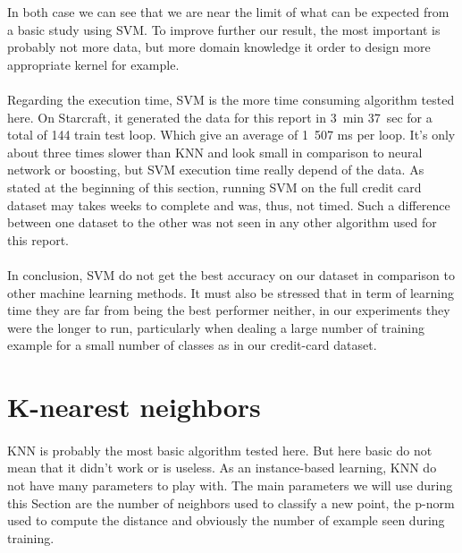\documentclass[twocolumn,a4paper,10pt]{article}
\begin{document}
In both case we can see that we are near the limit of what can be expected from a basic study using SVM. To improve further our result, the most important is probably not more data, but more domain knowledge it order to design more appropriate kernel for example.

\paragraph{}
Regarding the execution time, SVM is the more time consuming algorithm tested here. On Starcraft, it generated the data for this report in 3~min 37~sec for a total of 144 train test loop. Which give an average of 1~507 ms per loop. It's only about three times slower than KNN and look small in comparison to neural network or boosting, but SVM execution time really depend of the data. As stated at the beginning of this section, running SVM on the full credit card dataset may takes weeks to complete and was, thus, not timed. Such a difference between one dataset to the other was not seen in any other algorithm used for this report.

\paragraph{}
In conclusion, SVM do not get the best accuracy on our dataset in comparison to other machine learning methods. It must also be stressed that in term of learning time they are far from being the best performer neither, in our experiments they were the longer to run, particularly when dealing a large number of training example for a small number of classes as in our credit-card dataset.





\section{K-nearest neighbors}
\paragraph{}
KNN is probably the most basic algorithm tested here. But here basic do not mean that it didn't work or is useless. As an instance-based learning, KNN do not have many parameters to play with. The main parameters we will use during this Section are the number of neighbors used to classify a new point, the p-norm used to compute the distance and obviously the number of example seen during training.
\end{document}
